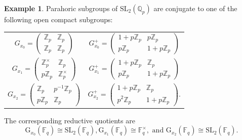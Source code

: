 \documentclass[25pt, a0paper, landscape]{tikzposter}
\newcommand{\Fq}{\mathbb{F}_q}
\newcommand{\SL}{\mathrm{SL}}
\newcommand{\QQ}{\mathbb{Q}}
\newcommand{\ZZ}{\mathbb{Z}}
\theoremstyle{definition}
\newtheorem*{example}{Example}
\begin{document}
\begin{columns}
{\begin{example}
            Parahoric subgroups of $\SL_2(\QQ_p)$ are conjugate to one of the following open compact subgroups:
            \begin{center}
                \begin{tabular}{cc}
                    $G_{x_0}=\begin{pmatrix} \ZZ_p & \ZZ_p \\ \ZZ_p & \ZZ_p \end{pmatrix}$ & $G_{x_0}^+=\begin{pmatrix} 1+p\ZZ_p & p\ZZ_p \\ p\ZZ_p & 1+p\ZZ_p \end{pmatrix}$ \\
                    
                    $G_{x_1}=\begin{pmatrix} \ZZ_p^\times & \ZZ_p \\ p\ZZ_p & \ZZ_p^\times \end{pmatrix}$ & $G_{x_1}^+=\begin{pmatrix} 1+p\ZZ_p & \ZZ_p \\ p\ZZ_p & 1+p\ZZ_p \end{pmatrix}$ \\
                    
                    $G_{x_2}=\begin{pmatrix} \ZZ_p & p^{-1}\ZZ_p \\ p\ZZ_p & \ZZ_p \end{pmatrix}$ & $G_{x_2}^+=\begin{pmatrix} 1+p\ZZ_p & \ZZ_p \\ p^2\ZZ_p & 1+p\ZZ_p \end{pmatrix}$.\\
                \end{tabular}
            \end{center}
            The corresponding reductive quotients are $$\mathrm{G}_{x_0}(\Fq) \cong \SL_2(\Fq), \mathrm{G}_{x_1}(\Fq) \cong \Fq^\times,\text{ and }\mathrm{G}_{x_2}(\Fq) \cong \SL_2(\Fq).$$
        \end{example}
    }
    


\end{columns}
\end{document}
